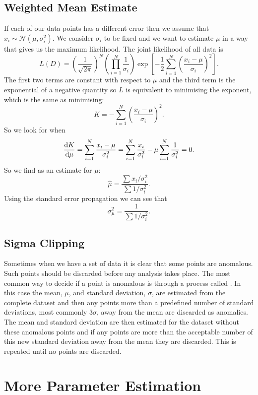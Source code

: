 \documentclass[a4paper]{article}
\newcommand{\distributed}{\sim}
\newcommand{\normal}{\mathcal{N}}
\begin{document}
    \subsection{Weighted Mean Estimate}
    If each of our data points has a different error then we assume that \(x_i \distributed \normal(\mu, \sigma_i^2)\).
    We consider \(\sigma_i\) to be fixed and we want to estimate \(\mu\) in a way that gives us the maximum likelihood.
    The joint likelihood of all data is
    \[L(D) = \left(\frac{1}{\sqrt{2\pi}}\right)^N \left(\prod_{i=1}^{N} \frac{1}{\sigma_i}\right)\exp\left[-\frac{1}{2}\sum_{i=1}^{N} \left(\frac{x_i - \mu}{\sigma_i}\right)^2\right].\]
    The first two terms are constant with respect to \(\mu\) and the third term is the exponential of a negative quantity so \(L\) is equivalent to minimising the exponent, which is the same as minimising:
    \[K = -\sum_{i=1}^{N}\left(\frac{x_i - \mu}{\sigma_i}\right)^2.\]
    So we look for when
    \[\dv{K}{\mu} = \sum_{i=1}^{N} \frac{x_i - \mu}{\sigma_i^2} = \sum_{i=1}^{N} \frac{x_i}{\sigma_i^2} - \mu\sum_{i=1}^{N}\frac{1}{\sigma_i^2} = 0.\]
    So we find as an estimate for \(\mu\):
    \[\hat{\mu} = \frac{\sum x_i/\sigma_i^2}{\sum 1/ \sigma_i^2}.\]
    Using the standard error propagation we can see that
    \[\sigma_\mu^2 = \frac{1}{\sum 1/\sigma_i^2}.\]
    
    \subsection{Sigma Clipping}
    Sometimes when we have a set of data it is clear that some points are anomalous.
    Such points should be discarded before any analysis takes place.
    The most common way to decide if a point is anomalous is through a process called .
    In this case the mean, \(\mu\), and standard deviation, \(\sigma\), are estimated from the complete dataset and then any points more than a predefined number of standard deviations, most commonly \(3\sigma\), away from the mean are discarded as anomalies.
    The mean and standard deviation are then estimated for the dataset without these anomalous points and if any points are more than the acceptable number of this new standard deviation away from the mean they are discarded.
    This is repeated until no points are discarded.
    
    \section{More Parameter Estimation}\label{sec:more parameter estimation}
\end{document}
